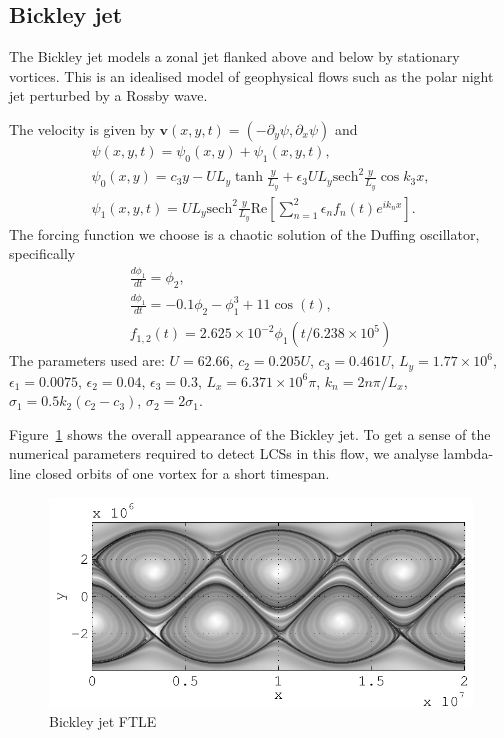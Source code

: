 \documentclass{article}
\begin{document}
\clearpage
\subsection{Bickley jet}

The Bickley jet models a zonal jet flanked above and below by
stationary vortices. This is an idealised model of geophysical flows
such as the polar night jet perturbed by a Rossby
wave\parencite{haller12:_geodes_theor_trans_barrier_two_dimen_flows,beron-vera10:_invar_lagran}.

The velocity is given by $\boldsymbol{v}(x,y,t) = (-\partial_y \psi, \partial_x \psi)$ and
\begin{gather*}
\psi(x,y,t) = \psi_0(x,y) + \psi_1(x,y,t),\\
\psi_0(x,y) = c_3 y - U L_y \tanh\frac{y}{L_y} + \epsilon_3 U L_y \mathrm{sech}^2\frac{y}{L_y} \cos k_3 x,\\
\psi_1(x,y,t) = U L_y \mathrm{sech}^2\frac{y}{L_y} \mathrm{Re}\left[ \sum_{n=1}^2 \epsilon_n f_n(t) e^{i k_n x}\right].
\end{gather*}
The forcing function we choose is a chaotic solution of the Duffing oscillator, specifically
\begin{gather*}
\frac{d \phi_1}{dt} = \phi_2,\\
\frac{d \phi_1}{dt} = -0.1 \phi_2 - \phi_1^3 + 11 \cos(t),\\
f_{1,2}(t) = 2.625 \times 10^{-2} \phi_1(t/6.238 \times 10^5)
\end{gather*}
The parameters used are: $U = 62.66$, $c_2 = 0.205 U$, $c_3 = 0.461 U$, $L_y = 1.77 \times 10^6$, $\epsilon_1 = 0.0075$, $\epsilon_2 = 0.04$, $\epsilon_3 = 0.3$, $L_x = 6.371 \times 10^6 \pi$, $k_n = 2 n \pi/L_x$, $\sigma_1 = 0.5 k_2 (c_2 - c_3)$, $\sigma_2 = 2 \sigma_1$.

Figure~\ref{f:Bickley jet FTLE} shows the overall appearance of the Bickley jet. To get a sense of the numerical parameters required to detect LCSs in this flow, we analyse lambda-line closed orbits of one vortex for a short timespan.

\begin{figure}
\begin{center}
\includegraphics[width=.85\textwidth]{graphics/bickley_jet/ftle_overview}
\end{center}
\caption{Bickley jet FTLE}
\label{f:Bickley jet FTLE}
\end{figure}
\end{document}
